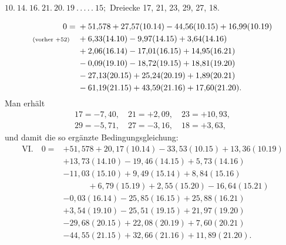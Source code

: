 \par\bigskip
\begin{center}
$10.\ 14.\ 16.\ 21.\ 20.\ 19\ .\,.\,.\,.\,.\ 15;$ Dreiecke 17, 21, 23, 29, 27, 18.
\end{center}
\[
\begin{aligned}
0={}&+51{,}578+27{,}57(10.14)-44{,}56(10.15)+16{,}99(10.19)\\
\text{\scriptsize(vorher $+52$)}\quad&+6{,}33(14.10)-9{,}97(14.15)+3{,}64(14.16)\\
&+2{,}06(16.14)-17{,}01(16.15)+14{,}95(16.21)\\
&-0{,}09(19.10)-18{,}72(19.15)+18{,}81(19.20)\\
&-27{,}13(20.15)+25{,}24(20.19)+1{,}89(20.21)\\
&-61{,}19(21.15)+43{,}59(21.16)+17{,}60(21.20).
\end{aligned}
\]
Man erhält
\[
\begin{gathered}
17=-7{,}40,\quad21=+2{,}09,\quad23=+10{,}93,\\
29=-5{,}71,\quad27=-3{,}16,\quad18=+3{,}63,
\end{gathered}
\]
und damit die so ergänzte Bedingungsgleichung:
\[
\begin{aligned}
\mathrm{VI.}\quad0={}&+51{,}578+20{,}17(10.14)-33{,}53(10.15)+13{,}36(10.19)\\
&+13{,}73(14.10)-19{,}46(14.15)+5{,}73(14.16)\\
&-11{,}03(15.10)+9{,}49(15.14)+8{,}84(15.16)\\
&\qquad\quad+6{,}79(15.19)+2{,}55(15.20)-16{,}64(15.21)\\
&-0{,}03(16.14)-25{,}85(16.15)+25{,}88(16.21)\\
&+3{,}54(19.10)-25{,}51(19.15)+21{,}97(19.20)\\
&-29{,}68(20.15)+22{,}08(20.19)+7{,}60(20.21)\\
&-44{,}55(21.15)+32{,}66(21.16)+11{,}89(21.20).
\end{aligned}
\]
